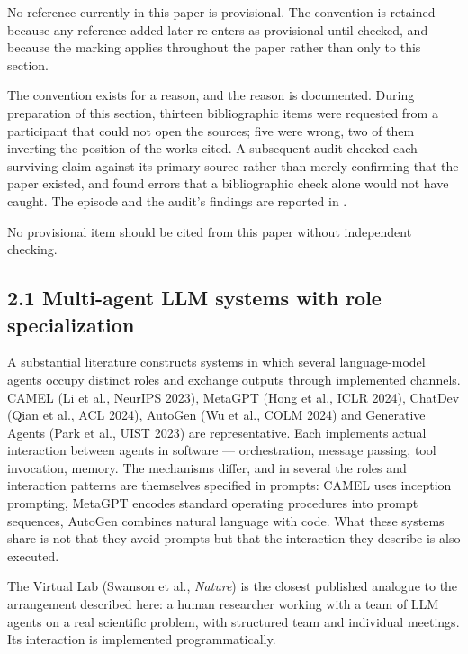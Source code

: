 No reference currently in this paper is provisional. The convention is retained because any reference added later re-enters as provisional until checked, and because the marking applies throughout the paper rather than only to this section.

The convention exists for a reason, and the reason is documented. During preparation of this section, thirteen bibliographic items were requested from a participant that could not open the sources; five were wrong, two of them inverting the position of the works cited. A subsequent audit checked each surviving claim against its primary source rather than merely confirming that the paper existed, and found errors that a bibliographic check alone would not have caught. The episode and the audit's findings are reported in .

No provisional item should be cited from this paper without independent checking.


\subsection*{2.1 Multi-agent LLM systems with role specialization}
\label{sec:en:2.1}

A substantial literature constructs systems in which several language-model agents occupy distinct roles and exchange outputs through implemented channels. \gcheck{} CAMEL (Li et al., NeurIPS 2023), MetaGPT (Hong et al., ICLR 2024), ChatDev (Qian et al., ACL 2024), AutoGen (Wu et al., COLM 2024) and Generative Agents (Park et al., UIST 2023) are representative. Each implements actual interaction between agents in software — orchestration, message passing, tool invocation, memory. The mechanisms differ, and in several the roles and interaction patterns are themselves specified in prompts: CAMEL uses inception prompting, MetaGPT encodes standard operating procedures into prompt sequences, AutoGen combines natural language with code. What these systems share is not that they avoid prompts but that the interaction they describe is also executed.
\nocite{li2023camel,hong2024metagpt,qian2024chatdev,wu2024autogen,park2023generative}

\gcheck{} The Virtual Lab (Swanson et al., \emph{Nature}) is the closest published analogue to the arrangement described here: a human researcher working with a team of LLM agents on a real scientific problem, with structured team and individual meetings. Its interaction is implemented programmatically.
\nocite{swanson2025virtuallab}

